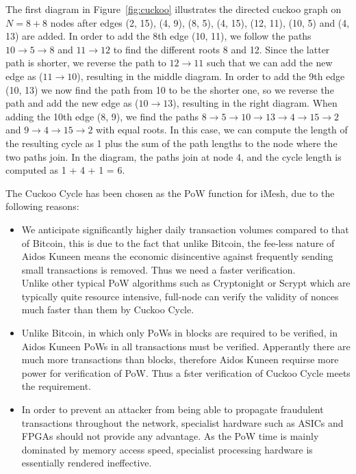 \documentclass[a4paper,10pt,twocolumn]{article}
\begin{document}
The first diagram in Figure~\ref{fig:cuckoo} illustrates the directed cuckoo graph on \( N = 8 + 8 \) nodes after edges (2, 15), (4, 
9), (8, 5), (4, 15), (12, 11), (10, 5) and (4, 13) are added. In order to add the 8th edge (10, 11), we follow the paths \( 10 
\rightarrow 5 \rightarrow 8 \) and \( 11 \rightarrow 12 \) to find the different roots 8 and 12. Since the latter path is shorter, we 
reverse the path to \( 12 \rightarrow 11\) such that we can add the new edge as (\( 11 \rightarrow 10\)), resulting in the middle 
diagram. In order to add the 9th edge (10, 13) we now find the path from 10 to be the shorter one, so we reverse the path and add the 
new edge as (\( 10 \rightarrow 13\)), resulting in the right diagram. When adding the 10th edge (8, 9), we find the paths
 \( 8 \rightarrow 5 \rightarrow 10 \rightarrow 13 \rightarrow 4  \rightarrow 15 \rightarrow 2 \) and \( 9 \rightarrow 4 \rightarrow 15 
 \rightarrow 2 \)  with equal roots. In this case, we can compute the length of the resulting cycle as 1 plus the sum of the path lengths to the node where the two paths join. In the diagram, the paths join at node 4, and the cycle length is computed as 1 + 4 + 1 
 = 6.

The Cuckoo Cycle has been chosen as the PoW function for iMesh, due to the following reasons:

\begin{itemize}
	\item We anticipate significantly higher daily transaction volumes compared to that of Bitcoin, this is due to the fact that unlike Bitcoin, the fee-less nature of Aidos Kuneen means the economic disincentive against frequently sending small transactions is removed. Thus we need a faster verification. \\
Unlike other typical PoW algorithms such as Cryptonight or Scrypt which are typically quite resource intensive, full-node can verify the validity of nonces much faster than them by Cuckoo Cycle. 

\item Unlike Bitcoin, in which  only PoWs in blocks are required to be verified, in Aidos Kuneen PoWs in all transactions must be verified. Apperantly there are much more transactions than blocks, therefore 
Aidos Kuneen requirse more power for verification of PoW. Thus a fster verification of Cuckoo Cycle meets the requirement.

\item In order to prevent an attacker from being able to propagate fraudulent transactions throughout the network, specialist hardware such as ASICs and FPGAs should not provide any advantage. As the PoW time is mainly dominated by memory access speed, specialist processing hardware is essentially rendered ineffective.
\end{itemize}
\end{document}
